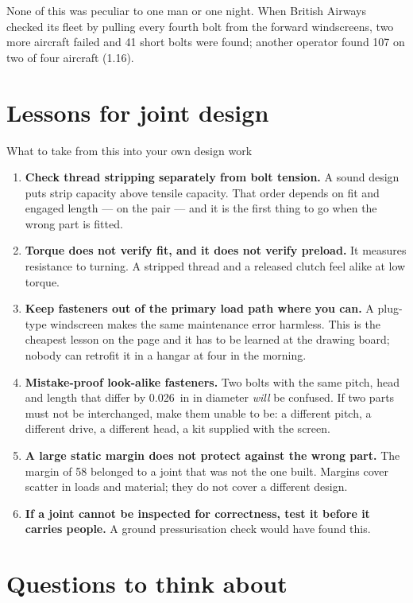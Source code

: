 \documentclass[11pt,a4paper]{article}
\begin{document}
\noindent None of this was peculiar to one man or one night. When British Airways checked its
fleet by pulling every fourth bolt from the forward windscreens, two more aircraft failed and 41
short bolts were found; another operator found 107 on two of four aircraft (1.16).

\section{Lessons for joint design}

\begin{sumbox}{What to take from this into your own design work}
\begin{enumerate}[leftmargin=*,itemsep=2pt]
\item \textbf{Check thread stripping separately from bolt tension.} A sound design puts strip
  capacity above tensile capacity. That order depends on fit and engaged length --- on the pair ---
  and it is the first thing to go when the wrong part is fitted.
\item \textbf{Torque does not verify fit, and it does not verify preload.} It measures resistance
  to turning. A stripped thread and a released clutch feel alike at low torque.
\item \textbf{Keep fasteners out of the primary load path where you can.} A plug-type windscreen
  makes the same maintenance error harmless. This is the cheapest lesson on the page and it has to
  be learned at the drawing board; nobody can retrofit it in a hangar at four in the morning.
\item \textbf{Mistake-proof look-alike fasteners.} Two bolts with the same pitch, head and length
  that differ by \SI{0.026}{in} in diameter \emph{will} be confused. If two parts must not be
  interchanged, make them unable to be: a different pitch, a different drive, a different head, a
  kit supplied with the screen.
\item \textbf{A large static margin does not protect against the wrong part.} The margin of 58
  belonged to a joint that was not the one built. Margins cover scatter in loads and material;
  they do not cover a different design.
\item \textbf{If a joint cannot be inspected for correctness, test it before it carries people.}
  A ground pressurisation check would have found this.
\end{enumerate}
\end{sumbox}

\section{Questions to think about}
\end{document}

